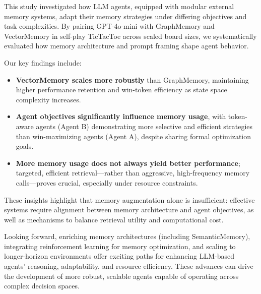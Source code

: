 \documentclass[10pt]{article}
\begin{document}
This study investigated how LLM agents, equipped with modular external memory systems, adapt their memory strategies under differing objectives and task complexities. By pairing GPT-4o-mini with GraphMemory and VectorMemory in self-play TicTacToe across scaled board sizes, we systematically evaluated how memory architecture and prompt framing shape agent behavior.

Our key findings include:

\begin{itemize}[leftmargin=*,nosep]
\item \textbf{VectorMemory scales more robustly} than GraphMemory, maintaining higher performance retention and win-token efficiency as state space complexity increases.
\item \textbf{Agent objectives significantly influence memory usage}, with token-aware agents (Agent B) demonstrating more selective and efficient strategies than win-maximizing agents (Agent A), despite sharing formal optimization goals.
\item \textbf{More memory usage does not always yield better performance}; targeted, efficient retrieval—rather than aggressive, high-frequency memory calls—proves crucial, especially under resource constraints.
\end{itemize}

These insights highlight that memory augmentation alone is insufficient: effective systems require alignment between memory architecture and agent objectives, as well as mechanisms to balance retrieval utility and computational cost.

Looking forward, enriching memory architectures (including SemanticMemory), integrating reinforcement learning for memory optimization, and scaling to longer-horizon environments offer exciting paths for enhancing LLM-based agents' reasoning, adaptability, and resource efficiency. These advances can drive the development of more robust, scalable agents capable of operating across complex decision spaces.



\end{document}
